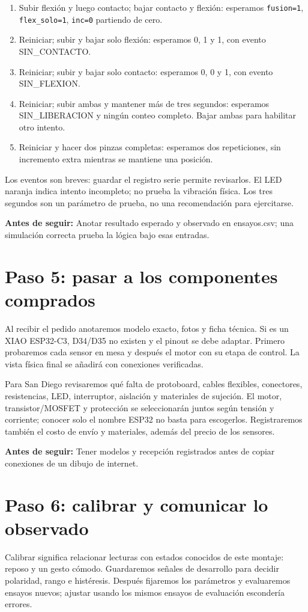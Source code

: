 \documentclass[11pt,a4paper]{article}
\newcommand{\comprobar}[1]{\par\smallskip\noindent\colorbox{suave}{\parbox{\dimexpr\linewidth-2\fboxsep}{\textbf{Antes de seguir:} #1}}\par\smallskip}
\begin{document}
\begin{enumerate}
\item Subir flexión y luego contacto; bajar contacto y flexión: esperamos \texttt{fusion=1}, \texttt{flex\_solo=1}, \texttt{inc=0} partiendo de cero.
\item Reiniciar; subir y bajar solo flexión: esperamos 0, 1 y 1, con evento SIN\_CONTACTO.
\item Reiniciar; subir y bajar solo contacto: esperamos 0, 0 y 1, con evento SIN\_FLEXION.
\item Reiniciar; subir ambas y mantener más de tres segundos: esperamos SIN\_LIBERACION y ningún conteo completo. Bajar ambas para habilitar otro intento.
\item Reiniciar y hacer dos pinzas completas: esperamos dos repeticiones, sin incremento extra mientras se mantiene una posición.
\end{enumerate}
Los eventos son breves: guardar el registro serie permite revisarlos. El LED naranja indica intento incompleto; no prueba la vibración física. Los tres segundos son un parámetro de prueba, no una recomendación para ejercitarse.
\comprobar{Anotar resultado esperado y observado en ensayos.csv; una simulación correcta prueba la lógica bajo esas entradas.}

\section{Paso 5: pasar a los componentes comprados}
Al recibir el pedido anotaremos modelo exacto, fotos y ficha técnica. Si es un XIAO ESP32-C3, D34/D35 no existen y el pinout se debe adaptar. Primero probaremos cada sensor en mesa y después el motor con su etapa de control. La vista física final se añadirá con conexiones verificadas.

Para San Diego revisaremos qué falta de protoboard, cables flexibles, conectores, resistencias, LED, interruptor, aislación y materiales de sujeción. El motor, transistor/MOSFET y protección se seleccionarán juntos según tensión y corriente; conocer solo el nombre ESP32 no basta para escogerlos. Registraremos también el costo de envío y materiales, además del precio de los sensores.
\comprobar{Tener modelos y recepción registrados antes de copiar conexiones de un dibujo de internet.}

\section{Paso 6: calibrar y comunicar lo observado}
Calibrar significa relacionar lecturas con estados conocidos de este montaje: reposo y un gesto cómodo. Guardaremos señales de desarrollo para decidir polaridad, rango e histéresis. Después fijaremos los parámetros y evaluaremos ensayos nuevos; ajustar usando los mismos ensayos de evaluación escondería errores.
\end{document}
